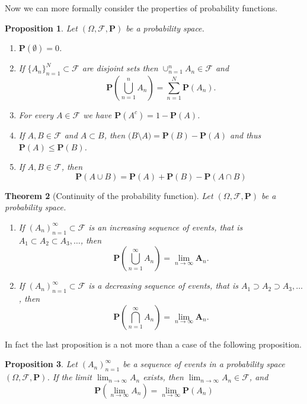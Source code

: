 \documentclass[11pt,a4paper]{article}
\theoremstyle{definition}
\theoremstyle{plain}
\newtheorem{theorem}{Theorem}[section]
\newtheorem{proposition}[theorem]{Proposition}
\newcommand{\Prob}{\mathbf{P}}
\begin{document}
  Now we can more formally consider the properties of probability functions.
  \begin{proposition}
    Let $(\Omega, \mathcal F, \Prob)$ be a probability space.
    \begin{enumerate}
      \item $\Prob(\emptyset) = 0$.
      \item If $\{A_n\}_{n=1}^{N} \subset \mathcal F$ are disjoint sets then
        $\cup_{n=1}^{n}{A_n} \in \mathcal F$ and
        \[
          \Prob\left(\bigcup_{n=1}^{n}{A_n}\right) = 
          \sum_{n=1}^{N}{\Prob(A_n)}.
        \]
      \item For every $A \in \mathcal F$ we have 
        $\Prob(A^c) = 1 - \Prob(A)$.
      \item If $A, B \in \mathcal F$ and $A \subset B$, then 
        $\mathbf(B \setminus A) = \Prob(B) - \Prob(A)$ and thus
        $\Prob(A) \le \Prob(B)$.
      \item If $A,B \in \mathcal F$, then
        \[
          \Prob(A \cup B) = 
          \Prob(A) + \Prob(B) - \Prob(A \cap B)
        \]
    \end{enumerate}
  \end{proposition}
  
  \begin{theorem}[Continuity of the probability function]
    \label{thm:continuity-base}
    Let $(\Omega, \mathcal F, \Prob)$ be a probability space.
    \begin{enumerate}
      \item If $(A_n)_{n=1}^{\infty} \subset \mathcal F$ is an increasing
        sequence of events, that is $A_1 \subset A_2 \subset A_3, \dots$,
        then
        \[
          \Prob\left(\bigcup_{n=1}^{\infty}{A_n}\right) = 
          \lim_{n \to \infty}{\mathbf A_n}.
        \]
      \item If $(A_n)_{n=1}^{\infty} \subset \mathcal F$ is a decreasing
        sequence of events, that is $A_1 \supset A_2 \supset A_3, \dots$,
        then
        \[
          \Prob\left(\bigcap_{n=1}^{\infty}{A_n}\right) = 
          \lim_{n \to \infty}{\mathbf A_n}.
        \]
    \end{enumerate}
  \end{theorem}

  In fact the last proposition is a not more than a case of the following
  proposition.

  \begin{proposition}
    Let $(A_n)_{n=1}^{\infty}$ be a sequence of events in a probability space
    $(\Omega, \mathcal F, \Prob)$. If the limit $\lim_{n \to \infty} A_n$
    exists, then $\lim_{n \to \infty} A_n \in \mathcal F$, and
    \[
      \Prob(\lim_{n \to \infty}{A_n}) = 
      \lim_{n \to \infty} \Prob(A_n)
    \]
  \end{proposition}
  
\end{document}
